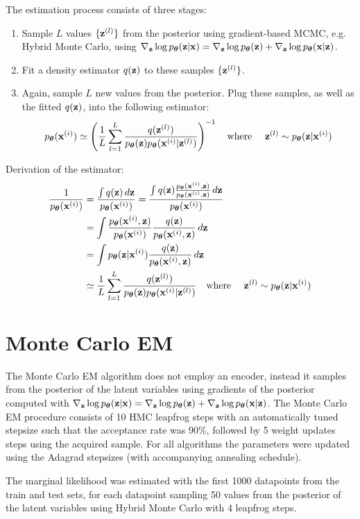 The estimation process consists of three stages:
\begin{enumerate}
\item Sample $L$ values $\{\bzl\}$ from the posterior using gradient-based MCMC, e.g. Hybrid Monte Carlo, using $\nabla_{\bz} \log \pT(\bz|\bx) = \nabla_{\bz} \log \pT(\bz) + \nabla_{\bz} \log \pT(\bx|\bz)$.
\item Fit a density estimator $q(\bz)$ to these samples $\{\bzl\}$.
\item Again, sample $L$ new values from the posterior. Plug these samples, as well as the fitted $q(\bz)$, into the following estimator:
\begin{align*}
\pT(\bxi) \simeq \left( \frac{1}{L} \sum_{l=1}^L \frac{q(\bzl)}{\pT(\bz) \pT(\bxi|\bzl)} \right)^{-1} \text{\quad where \quad} \bzl \sim \pT(\bz|\bxi)
\end{align*}
\end{enumerate}

Derivation of the estimator:
\begin{align*}
\frac{1}{\pT(\bxi)} 
&= \frac{\int q(\bz) \,d\bz}{\pT(\bxi)}
= \frac{\int q(\bz) \frac{\pT(\bxi, \bz) }{\pT(\bxi, \bz)} \,d\bz}{\pT(\bxi)} \\
&= \int \frac{\pT(\bxi, \bz)}{\pT(\bxi)} \frac{q(\bz)}{\pT(\bxi, \bz)} \,d\bz \\
&= \int \pT(\bz|\bxi) \frac{q(\bz)}{\pT(\bxi, \bz)} \,d\bz \\
&\simeq \frac{1}{L} \sum_{l=1}^L \frac{q(\bzl)}{\pT(\bz) \pT(\bxi|\bzl)} \text{\quad where \quad} \bzl \sim \pT(\bz|\bxi)
\end{align*}

\section{Monte Carlo EM}
The Monte Carlo EM algorithm does not employ an encoder, instead it samples from the posterior of the latent variables using gradients of the posterior computed with $\nabla_{\bz} \log \pT(\bz|\bx) = \nabla_{\bz} \log \pT(\bz) + \nabla_{\bz} \log \pT(\bx|\bz)$. The Monte Carlo EM procedure consists of 10 HMC leapfrog steps with an automatically tuned stepsize such that the acceptance rate was 90\%, followed by 5 weight updates steps using the acquired sample. For all algorithms the parameters were updated using the Adagrad stepsizes (with accompanying annealing schedule).

The marginal likelihood was estimated with the first 1000 datapoints from the train and test sets, for each datapoint sampling 50 values from the posterior of the latent variables using Hybrid Monte Carlo with 4 leapfrog steps. 

